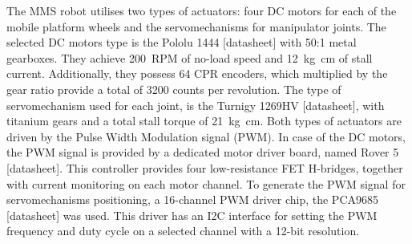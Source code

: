 The MMS robot utilises two types of actuators: four DC motors for each of the mobile platform wheels and the servomechanisms for manipulator joints. The selected DC motors type is the Pololu 1444 [datasheet] with 50:1 metal gearboxes. They achieve \SI{200}{RPM} of no-load speed and \SI{12}{\kilogram \centi\metre} of stall current. Additionally, they possess 64 CPR encoders, which multiplied by the gear ratio provide a total of 3200 counts per revolution. The type of servomechanism used for each joint, is the Turnigy 1269HV [datasheet], with titanium gears and a total stall torque of \SI{21}{\kilogram\centi\metre}. Both types of actuators are driven by the Pulse Width Modulation signal (PWM). In case of the DC motors, the PWM signal is provided by a dedicated motor driver board, named Rover 5 [datasheet]. This controller provides four low-resistance FET H-bridges, together with current monitoring on each motor channel. To generate the PWM signal for servomechanisms positioning, a 16-channel PWM driver chip, the PCA9685 [datasheet] was used. This driver has an I2C interface for setting the PWM frequency and duty cycle on a selected channel with a 12-bit resolution.



